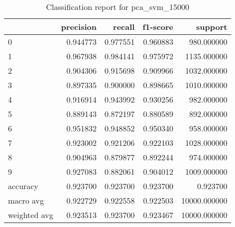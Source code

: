 \begin{table}[htb!]
\centering
\caption{Classification report for pca_svm_15000}
\label{tab:classification-report-pca_svm_15000}
\begin{tabular}{lrrrr}
\toprule
 & precision & recall & f1-score & support \\
\midrule
0 & 0.944773 & 0.977551 & 0.960883 & 980.000000 \\
1 & 0.967938 & 0.984141 & 0.975972 & 1135.000000 \\
2 & 0.904306 & 0.915698 & 0.909966 & 1032.000000 \\
3 & 0.897335 & 0.900000 & 0.898665 & 1010.000000 \\
4 & 0.916914 & 0.943992 & 0.930256 & 982.000000 \\
5 & 0.889143 & 0.872197 & 0.880589 & 892.000000 \\
6 & 0.951832 & 0.948852 & 0.950340 & 958.000000 \\
7 & 0.923002 & 0.921206 & 0.922103 & 1028.000000 \\
8 & 0.904963 & 0.879877 & 0.892244 & 974.000000 \\
9 & 0.927083 & 0.882061 & 0.904012 & 1009.000000 \\
accuracy & 0.923700 & 0.923700 & 0.923700 & 0.923700 \\
macro avg & 0.922729 & 0.922558 & 0.922503 & 10000.000000 \\
weighted avg & 0.923513 & 0.923700 & 0.923467 & 10000.000000 \\
\bottomrule
\end{tabular}
\end{table}
